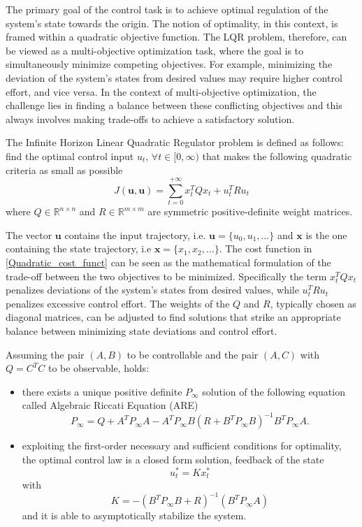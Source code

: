 \documentclass[a4paper,12pt,oneside]{book}
\begin{document}
The primary goal of the control task is to achieve optimal regulation of the system's state towards the origin. 
The notion of optimality, in this context, is framed within a quadratic objective function.
The LQR problem, therefore, can be viewed as a multi-objective optimization task, where the goal is to simultaneously minimize competing objectives.
For example, minimizing the deviation of the system's states from desired values may require higher control effort, and vice versa.
In the context of multi-objective optimization, the challenge lies in finding a balance between these conflicting objectives and this always involves making trade-offs to achieve a satisfactory solution.

\bigskip
The Infinite Horizon Linear Quadratic Regulator problem is defined as follows:
find the optimal control input $u_t, \, \forall t \in [0, \infty)$ that makes the following quadratic criteria as small as possible
\begin{equation}
    J(\boldsymbol{u}, \boldsymbol{u})  = \sum_{t=0} ^{+\infty} x_t^T Q x_t + u_t ^T R u_t
\label{Quadratic_cost_funct}
\end{equation}
where $Q \in \mathbb{R}^{n \times n}$ and $R \in \mathbb{R}^{m \times m}$ are symmetric positive-definite weight matrices.

The vector $\boldsymbol{u}$ contains the input trajectory, i.e. $\boldsymbol{u} = \{u_0, u_1, \dots\}$ and $\boldsymbol{x}$ is the one containing the state trajectory, i.e $\boldsymbol{x} = \{x_1, x_2, \dots\}$.
The cost function in \ref{Quadratic_cost_funct} can be seen as the mathematical formulation of the trade-off between the two objectives to be minimized.
Specifically the term $x_t^T Q x_t$ penalizes deviations of the system's states from desired values, while $u_t^T R u_t$ penalizes excessive control effort.
The weights of the $Q$ and $R$, typically chosen as diagonal matrices, can be adjusted to find solutions that strike an appropriate balance between minimizing state deviations and control effort.


\bigskip
Assuming the pair $(A,B)$ to be controllable and the pair $(A,C)$ with $Q = C^T C$ to be observable, holds:
\begin{itemize}
    \item there exists a unique positive definite $P_\infty$ solution of the following equation called Algebraic Riccati Equation (ARE)
    \begin{equation}
        P_\infty = Q + A^T P_\infty A - A^T P_\infty B (R + B^T P_\infty B)^{-1} B^T P_\infty A.
    \end{equation}
    \item exploiting the first-order necessary and sufficient conditions for optimality, the optimal control law is a closed form solution, feedback of the state
    \begin{equation}
        u_t^* = K x_t^*
    \end{equation}
    with
    \begin{equation}
        K = -( B^T P_\infty B + R)^{-1}(B^T P_\infty A)
    \label{eq:Regulator_LQR}
    \end{equation}
    and it is able to asymptotically stabilize the system.
\end{itemize}
\end{document}

